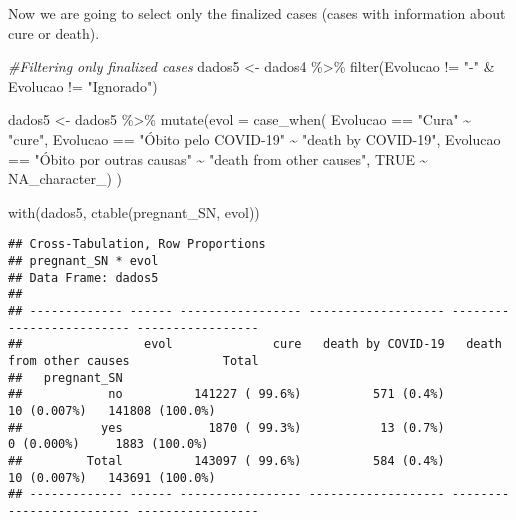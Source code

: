 \documentclass[
]{article}
\newenvironment{Shaded}{\begin{snugshade}}{\end{snugshade}}
\newcommand{\AttributeTok}[1]{\textcolor[rgb]{0.77,0.63,0.00}{#1}}
\newcommand{\CommentTok}[1]{\textcolor[rgb]{0.56,0.35,0.01}{\textit{#1}}}
\newcommand{\ConstantTok}[1]{\textcolor[rgb]{0.00,0.00,0.00}{#1}}
\newcommand{\FunctionTok}[1]{\textcolor[rgb]{0.00,0.00,0.00}{#1}}
\newcommand{\NormalTok}[1]{#1}
\newcommand{\OtherTok}[1]{\textcolor[rgb]{0.56,0.35,0.01}{#1}}
\newcommand{\SpecialCharTok}[1]{\textcolor[rgb]{0.00,0.00,0.00}{#1}}
\newcommand{\StringTok}[1]{\textcolor[rgb]{0.31,0.60,0.02}{#1}}
\begin{document}
Now we are going to select only the finalized cases (cases with
information about cure or death).

\begin{Shaded}
\begin{Highlighting}[]
\CommentTok{\#Filtering only finalized cases}
\NormalTok{dados5 }\OtherTok{\textless{}{-}}\NormalTok{ dados4 }\SpecialCharTok{\%\textgreater{}\%} 
  \FunctionTok{filter}\NormalTok{(Evolucao }\SpecialCharTok{!=} \StringTok{"{-}"} \SpecialCharTok{\&}\NormalTok{ Evolucao  }\SpecialCharTok{!=} \StringTok{"Ignorado"}\NormalTok{)}

\NormalTok{dados5 }\OtherTok{\textless{}{-}}\NormalTok{ dados5 }\SpecialCharTok{\%\textgreater{}\%} 
  \FunctionTok{mutate}\NormalTok{(}\AttributeTok{evol =} \FunctionTok{case\_when}\NormalTok{(}
\NormalTok{    Evolucao }\SpecialCharTok{==} \StringTok{"Cura"} \SpecialCharTok{\textasciitilde{}} \StringTok{"cure"}\NormalTok{, }
\NormalTok{    Evolucao }\SpecialCharTok{==} \StringTok{"Óbito pelo COVID{-}19"} \SpecialCharTok{\textasciitilde{}} \StringTok{"death by COVID{-}19"}\NormalTok{, }
\NormalTok{    Evolucao }\SpecialCharTok{==} \StringTok{"Óbito por outras causas"} \SpecialCharTok{\textasciitilde{}} \StringTok{"death from other causes"}\NormalTok{, }
    \ConstantTok{TRUE} \SpecialCharTok{\textasciitilde{}} \ConstantTok{NA\_character\_}\NormalTok{)}
\NormalTok{  )}

\FunctionTok{with}\NormalTok{(dados5, }\FunctionTok{ctable}\NormalTok{(pregnant\_SN, evol))}
\end{Highlighting}
\end{Shaded}

\begin{verbatim}
## Cross-Tabulation, Row Proportions  
## pregnant_SN * evol  
## Data Frame: dados5  
## 
## ------------- ------ ----------------- ------------------- ------------------------- -----------------
##                 evol              cure   death by COVID-19   death from other causes             Total
##   pregnant_SN                                                                                         
##            no          141227 ( 99.6%)          571 (0.4%)               10 (0.007%)   141808 (100.0%)
##           yes            1870 ( 99.3%)           13 (0.7%)                0 (0.000%)     1883 (100.0%)
##         Total          143097 ( 99.6%)          584 (0.4%)               10 (0.007%)   143691 (100.0%)
## ------------- ------ ----------------- ------------------- ------------------------- -----------------
\end{verbatim}
\end{document}
